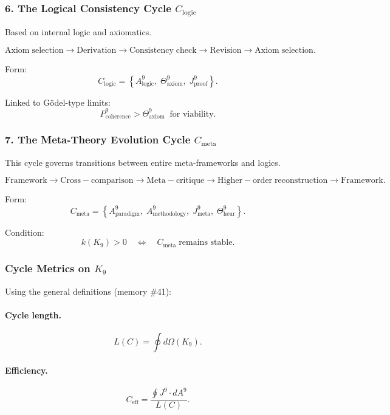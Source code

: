 \subsubsection{6. The Logical Consistency Cycle $C_{\mathrm{logic}}$}

Based on internal logic and axiomatics.

\[
  \mathrm{Axiom\;selection}
  \to
  \mathrm{Derivation}
  \to
  \mathrm{Consistency\;check}
  \to
  \mathrm{Revision}
  \to
  \mathrm{Axiom\;selection}.
\]

Form:
\[
 C_{\mathrm{logic}}
  =
  \left\{
    A^9_{\mathrm{logic}},\;
    \Theta^9_{\mathrm{axiom}},\;
    J^9_{\mathrm{proof}}
  \right\}.
\]

Linked to Gödel-type limits:
\[
  P^9_{\mathrm{coherence}} > \Theta^9_{\mathrm{axiom}}
  \;\;\text{for viability}.
\]


\subsubsection{7. The Meta-Theory Evolution Cycle $C_{\mathrm{meta}}$}

This cycle governs transitions between entire meta-frameworks and logics.

\[
  \mathrm{Framework}
  \to
  \mathrm{Cross\!-\!comparison}
  \to
  \mathrm{Meta\!-\!critique}
  \to
  \mathrm{Higher\!-\!order\;reconstruction}
  \to
  \mathrm{Framework}.
\]

Form:
\[
 C_{\mathrm{meta}}
 =
 \left\{
   A^9_{\mathrm{paradigm}},\;
   A^9_{\mathrm{methodology}},\;
   J^9_{\mathrm{meta}},\;
   \Theta^9_{\mathrm{heur}}
 \right\}.
\]

Condition:
\[
  k(K_9) > 0 \quad\Leftrightarrow\quad
  C_{\mathrm{meta}}\;\text{remains stable}.
\]


\subsubsection{Cycle Metrics on \texorpdfstring{$K_9$}{K_9}}

Using the general definitions (memory \#41):

\paragraph{Cycle length.}
\[
  L(C) = \oint d\Omega(K_9).
\]

\paragraph{Efficiency.}
\[
  C_{\mathrm{eff}} = 
  \frac{\oint J^9 \cdot dA^9}{L(C)}.
\]

